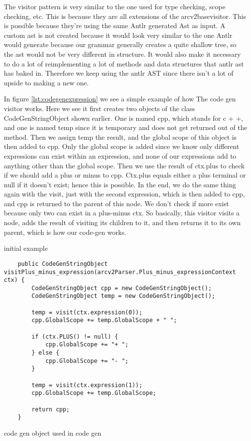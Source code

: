 The visitor pattern is very similar to the one used for type checking, scope checking, etc. This is because they are all extensions of the arcv2basevisitor. This is possible because they're using the same Antlr generated Ast as input. A custom ast is not created because it would look very similar to the one Antlr would generate because our grammar generally creates a quite shallow tree, so the ast would not be very different in structure. It would also make it necessary to do a lot of reimplementing a lot of methods and data structures that antlr ast has baked in. Therefore we keep using the antlr AST since there isn't a lot of upside to making a new one.  


In figure \ref{lst:codegenexpression} we see a simple example of how The code gen visitor works. Here we see it first creates two objects of the class CodeGenStringObject shown earlier. One is named cpp, which stands for c + +, and one is named temp since it is temporary and does not get returned out of the method. Then we assign temp the result, and the global scope of this object is then added to cpp. Only the global scope is added since we know only different expressions can exist within an expression, and none of our expressions add to anything other than the global scope. Then we use the result of ctx.plus to check if we should add a plus or minus to cpp. Ctx.plus equals either a plus terminal or null if it doesn't exist; hence this is possible. In the end, we do the same thing again with the visit, just with the second expression, which is then added to cpp, and cpp is returned to the parent of this node. We don't check if more exist because only two can exist in a plus-minus ctx. So basically, this visitor visits a node, adds the result of visiting its children to it, and then returns it to its own parent, which is how our code-gen works.




initial example 
\begin{listing}[htb!]
    \begin{verbatim}
    public CodeGenStringObject visitPlus_minus_expression(arcv2Parser.Plus_minus_expressionContext ctx) {
        CodeGenStringObject cpp = new CodeGenStringObject();
        CodeGenStringObject temp = new CodeGenStringObject();

        temp = visit(ctx.expression(0));
        cpp.GlobalScope += temp.GlobalScope + " ";

        if (ctx.PLUS() != null) {
            cpp.GlobalScope += "+ ";
        } else {
            cpp.GlobalScope += "- ";
        }

        temp = visit(ctx.expression(1));
        cpp.GlobalScope += temp.GlobalScope;

        return cpp;
    }
\end{verbatim}
\caption{code gen object used in code gen}
\label{lst:codegenexpression}
\end{listing}


